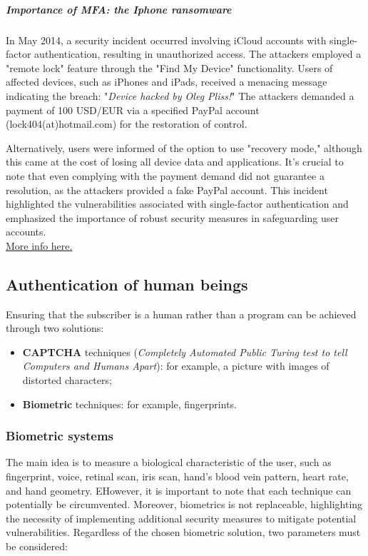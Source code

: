 \subparagraph{Importance of MFA: the Iphone ransomware}
In May 2014, a security incident occurred involving iCloud accounts with single-factor authentication, resulting in unauthorized access. 
The attackers employed a "remote lock" feature through the "Find My Device" functionality. Users of affected devices, such as iPhones and iPads, received a menacing message indicating the breach: "\textit{Device hacked by Oleg Pliss!}" 
The attackers demanded a payment of 100 USD/EUR via a specified PayPal account (lock404(at)hotmail.com) for the restoration of control. 

Alternatively, users were informed of the option to use "recovery mode," although this came at the cost of losing all device data and applications. It's crucial to note that even complying with the payment demand did not guarantee a resolution, as the attackers provided a fake PayPal account.
This incident highlighted the vulnerabilities associated with single-factor authentication and emphasized the importance of robust security measures in safeguarding user accounts.\\
\href{http://thehackernews.com/2014/05/apple-devices-hacked-by-oleg-pliss-held.html}{More info here.}

\subsection{Authentication of human beings}
Ensuring that the subscriber is a human rather than a program can be achieved through two solutions:
\begin{itemize}
    \item \textbf{CAPTCHA} techniques (\textit{Completely Automated Public Turing test to tell Computers and Humans
    Apart}): for example, a picture with images of distorted characters;
    \item \textbf{Biometric} techniques: for example, fingerprints.
\end{itemize}


\subsubsection{Biometric systems}
The main idea is to measure a biological characteristic of the user, such as fingerprint, voice, retinal scan, iris scan, hand's blood vein pattern, heart rate, and hand geometry.
EHowever, it is important to note that each technique can potentially be circumvented. Moreover, biometrics is not replaceable, highlighting the necessity of implementing additional security measures to mitigate potential vulnerabilities. 
Regardless of the chosen biometric solution, two parameters must be considered:

